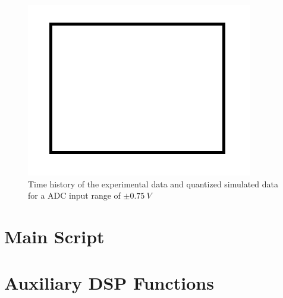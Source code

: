 \documentclass[10pt,letterpaper,twocolumn]{article}
\begin{document}
    \begin{figure}[h]
        \centering
        \includegraphics[width=0.6\linewidth]{img/sample}
        \captionsetup{width=0.6\textwidth}
        \caption{Time history of the experimental data and quantized simulated data for a ADC input range of $\pm 0.75\ V$}
        \label{fig:range075}
    \end{figure}

\clearpage
\section{Main Script}
    

\clearpage
\section{Auxiliary DSP Functions}
    
\end{document}
